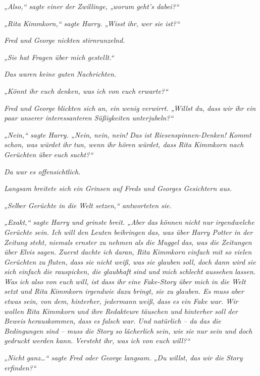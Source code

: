 {\emph{„Also,“ sagte einer der Zwillinge, „worum geht's dabei?“}

\emph{„Rita Kimmkorn,“ sagte Harry. „Wisst ihr, wer sie ist?“}

\emph{Fred und George nickten stirnrunzelnd.}

\emph{„Sie hat Fragen über mich gestellt.“}

\emph{Das waren keine guten Nachrichten.}

\emph{„Könnt ihr euch denken, was ich von euch erwarte?“}

\emph{Fred und George blickten sich an, ein wenig verwirrt. „Willst du, dass wir ihr ein paar unserer interessanteren Süßigkeiten unterjubeln?“}

\emph{„Nein,“ sagte Harry. „Nein, nein,} \emph{\emph{nein!}} \emph{Das ist Riesenspinnen-Denken! Kommt schon, was würdet} \emph{\emph{ihr}} \emph{tun, wenn ihr hören würdet, dass Rita Kimmkorn nach Gerüchten über} \emph{\emph{euch}} \emph{sucht?“}

\emph{Da war es offensichtlich.}

\emph{Langsam breitete sich ein Grinsen auf Freds und Georges Gesichtern aus.}

\emph{„Selber Gerüchte in die Welt setzen,“ antworteten sie.}

\emph{„\emph{Exakt,}“ sagte Harry und grinste breit. „Aber das können nicht nur} \emph{\emph{irgendwelche}} \emph{Gerüchte sein. Ich will den Leuten beibringen das, was über Harry Potter in der Zeitung steht, niemals ernster zu nehmen als die Muggel das, was die Zeitungen über Elvis sagen. Zuerst dachte ich daran, Rita Kimmkorn einfach mit so vielen Gerüchten zu fluten, dass sie nicht weiß, was sie glauben soll, doch dann wird sie sich einfach die rauspicken, die glaubhaft} \emph{sind} \emph{und} \emph{mich} \emph{schlecht aussehen} \emph{lassen. Was ich also von euch will, ist dass ihr eine Fake-Story über mich in die Welt setzt und Rita Kimmkorn irgendwie dazu bringt, sie zu glauben. Es muss aber etwas sein, von dem, hinterher, jedermann} \emph{\emph{weiß,}} \emph{dass es ein Fake war. Wir wollen Rita Kimmkorn und ihre Redakteure täuschen und} \emph{\emph{hinterher}} \emph{soll der Beweis herauskommen, dass es falsch war. Und natürlich -- da das die Bedingungen sind -- muss die Story so} \emph{\emph{lächerlich}} \emph{sein, wie sie nur sein und doch gedruckt werden kann. Versteht ihr, was ich von euch will?“}

\emph{„Nicht ganz…“ sagte Fred oder George langsam. „Du willst, das wir die} \emph{Story} \emph{\emph{erfinden?}“}

}
